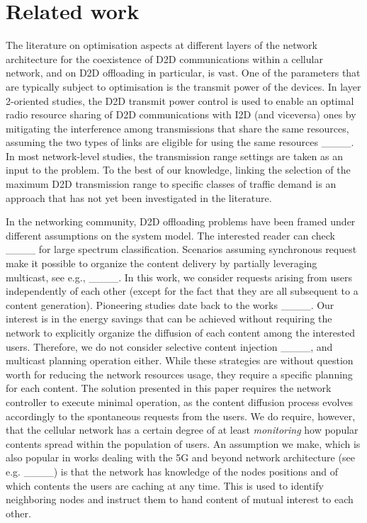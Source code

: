 \section{Related work\label{sec:Related-work}
}

The literature on optimisation aspects at different layers of the
network architecture for the coexistence of D2D communications within
a cellular network, and on D2D offloading in particular, is vast.
One of the parameters that are typically subject to optimisation is
the transmit power of the devices. In layer 2-oriented studies, the
D2D transmit power control is used to enable an optimal radio resource
sharing of D2D communications with I2D (and viceversa) ones by mitigating
the interference among transmissions that share the same resources,
assuming the two types of links are eligible for using the same resources
____. In most network-level studies, the transmission
range settings are taken as an input to the problem. To the best of
our knowledge, linking the selection of the maximum D2D transmission
range to specific classes of traffic demand is an approach that has
not yet been investigated in the literature.

In the networking community, D2D offloading problems have been framed
under different assumptions on the system model. The interested reader
can check ____ for large spectrum classification.
Scenarios assuming synchronous request make it possible to organize
the content delivery by partially leveraging multicast, see e.g.,
____. In this work, we consider requests arising
from users independently of each other (except for the fact that they
are all subsequent to a content generation). Pioneering studies date
back to the works ____. Our interest
is in the energy savings that can be achieved without requiring the
network to explicitly organize the diffusion of each content among
the interested users. Therefore, we do not consider selective content
injection ____, and multicast planning
operation either. While these strategies are without question worth
for reducing the network resources usage, they require a specific
planning for each content. The solution presented in this paper requires
the network controller to execute minimal operation, as the content
diffusion process evolves accordingly to the spontaneous requests
from the users. We do require, however, that the cellular network
has a certain degree of at least \emph{monitoring} how popular contents
spread within the population of users. An assumption we make, which
is also popular in works dealing with the 5G and beyond network architecture
(see e.g. ____) is that the network has knowledge of the
nodes positions and of which contents the users are caching at any
time. This is used to identify neighboring nodes and instruct them
to hand content of mutual interest to each other.

